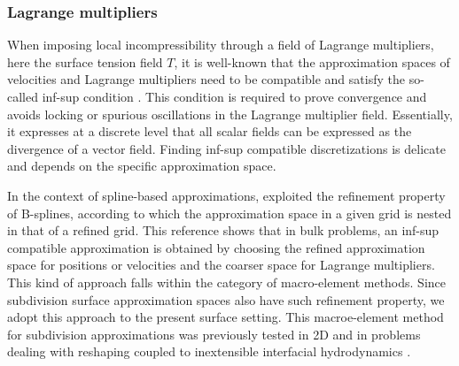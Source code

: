 


\subsubsection*{Lagrange multipliers}

When imposing local incompressibility through a field of Lagrange multipliers, here the surface tension field $T$, it is well-known that the approximation spaces of velocities and Lagrange multipliers need to be compatible and satisfy the so-called inf-sup condition \cite{brezzi2012}. This condition is required to prove convergence and avoids locking or spurious oscillations in the Lagrange multiplier field. Essentially, it expresses at a discrete level that all scalar fields can be expressed as the divergence of a vector field. Finding inf-sup compatible discretizations is delicate and depends on the specific approximation space.

In the context of spline-based approximations, \citet{dortdivanlioglu2018} exploited the refinement property of B-splines, according to which the approximation space in a given grid is nested in that of a refined grid. This reference shows that in bulk problems, an inf-sup compatible approximation is obtained by choosing the refined approximation space for positions or velocities and the coarser space for Lagrange multipliers. This kind of approach falls within the category of macro-element methods. Since subdivision surface approximation spaces also have such refinement property, we adopt this approach to the present surface setting. This macroe-element method for subdivision approximations was previously tested in 2D and in problems dealing with reshaping coupled to inextensible interfacial hydrodynamics  \cite{torres2019}.

